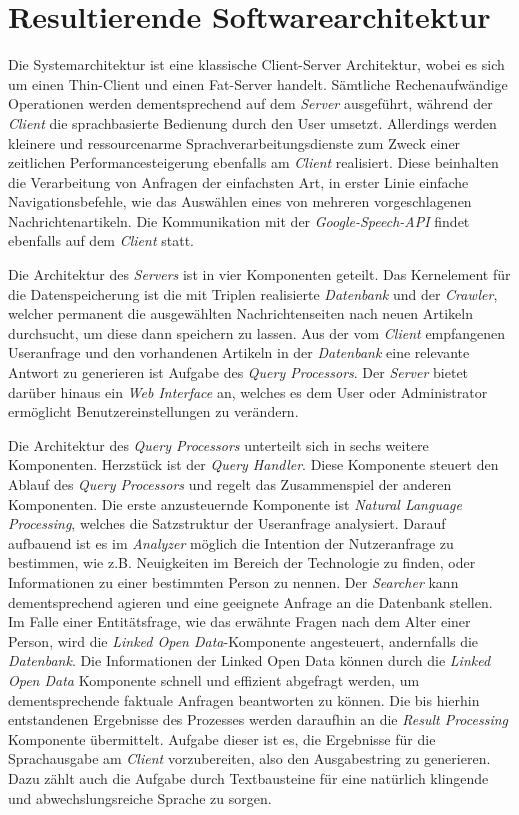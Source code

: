 
\chapter{Resultierende Softwarearchitektur}\label{chap:architektur}

Die \NewsGenie Systemarchitektur ist eine klassische Client-Server Architektur, wobei es sich um einen Thin-Client
und einen Fat-Server handelt. Sämtliche Rechenaufwändige Operationen werden dementsprechend auf dem \textit{Server} ausgeführt,
während der \textit{Client} die sprachbasierte Bedienung durch den User umsetzt. Allerdings werden kleinere und ressourcenarme  Sprachverarbeitungsdienste zum Zweck einer zeitlichen Performancesteigerung ebenfalls am \textit{Client}
realisiert. Diese beinhalten die Verarbeitung von Anfragen der einfachsten Art, in erster Linie einfache Navigationsbefehle, wie das Auswählen eines von mehreren vorgeschlagenen Nachrichtenartikeln. 
Die Kommunikation mit der \textit{Google-Speech-API} findet ebenfalls auf dem \textit{Client} statt.

Die Architektur des \textit{Servers} ist in vier Komponenten geteilt. Das Kernelement für die Datenspeicherung ist 
die mit Triplen realisierte \textit{Datenbank} und der \textit{Crawler}, welcher permanent die ausgewählten Nachrichtenseiten nach neuen Artikeln durchsucht, um diese dann speichern zu lassen. Aus der vom \textit{Client} empfangenen Useranfrage und den vorhandenen Artikeln in der \textit{Datenbank} eine relevante Antwort zu generieren ist Aufgabe des \textit{Query Processors}. 
Der \textit{Server} bietet darüber hinaus ein \textit{Web Interface} an, welches es dem User oder Administrator ermöglicht Benutzereinstellungen zu verändern.

Die Architektur des \textit{Query Processors} unterteilt sich in sechs weitere Komponenten. Herzstück ist der \textit{Query Handler}.
Diese Komponente steuert den Ablauf des \textit{Query Processors} und regelt das Zusammenspiel der anderen Komponenten. 
Die erste anzusteuernde Komponente ist \textit{Natural Language Processing}, welches die Satzstruktur der Useranfrage analysiert. Darauf aufbauend ist es im \textit{Analyzer} möglich die Intention der Nutzeranfrage zu bestimmen, wie z.B. Neuigkeiten im Bereich der Technologie zu finden, oder Informationen zu einer bestimmten Person zu nennen. 
Der \textit{Searcher} kann dementsprechend agieren und eine geeignete Anfrage an die Datenbank stellen. Im Falle einer Entitätsfrage, wie das erwähnte Fragen nach dem Alter einer Person, wird die \textit{Linked Open Data}-Komponente angesteuert, andernfalls die \textit{Datenbank}.
Die Informationen der Linked Open Data können durch die \textit{Linked Open Data} Komponente schnell und effizient abgefragt werden, um dementsprechende faktuale Anfragen beantworten zu können. 
Die bis hierhin entstandenen Ergebnisse des Prozesses werden daraufhin an die \textit{Result Processing} Komponente übermittelt.
Aufgabe dieser ist es, die Ergebnisse für die Sprachausgabe am \textit{Client} vorzubereiten, also den Ausgabestring zu generieren. Dazu zählt auch die Aufgabe durch Textbausteine für eine natürlich klingende und abwechslungsreiche Sprache zu sorgen.

